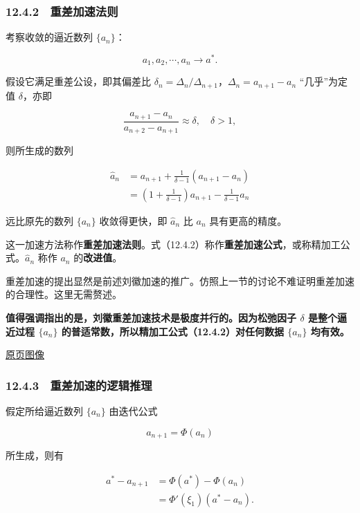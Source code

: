 \documentclass[
  10pt,
  fontset=fandol]{ctexart}
\begin{document}
\subsubsection{12.4.2　重差加速法则}\label{ux91cdux5deeux52a0ux901fux6cd5ux5219}

考察收敛的逼近数列 \(\{a_n\}\)：

\[
a_1,a_2,\cdots,a_n\to a^*.
\]

假设它满足重差公设，即其偏差比 \(\delta_n=\Delta_n/\Delta_{n+1}\)，\(\Delta_n=a_{n+1}-a_n\) ``几乎''为定值 \(\delta\)，亦即

\[
\frac{a_{n+1}-a_n}{a_{n+2}-a_{n+1}}\approx\delta,\quad\delta>1,
\tag{12.4.1}
\]

则所生成的数列

\[
\begin{aligned}
\widehat a_n&=a_{n+1}+\frac{1}{\delta-1}(a_{n+1}-a_n)\\
&=\left(1+\frac{1}{\delta-1}\right)a_{n+1}-\frac{1}{\delta-1}a_n
\end{aligned}
\tag{12.4.2}
\]

远比原先的数列 \(\{a_n\}\) 收敛得更快，即 \(\widehat a_n\) 比 \(a_n\) 具有更高的精度。

这一加速方法称作\textbf{重差加速法则}。式（12.4.2）称作\textbf{重差加速公式}，或称精加工公式。\(\widehat a_n\) 称作 \(a_n\) 的\textbf{改进值}。

重差加速的提出显然是前述刘徽加速的推广。仿照上一节的讨论不难证明重差加速的合理性。这里无需赘述。

\textbf{值得强调指出的是，刘徽重差加速技术是极度并行的。因为松弛因子 \(\delta\) 是整个逼近过程 \(\{a_n\}\) 的普适常数，所以精加工公式（12.4.2）对任何数据 \(\{a_n\}\) 均有效。}

\href{../../source-images/pdf-306.jpeg}{原页图像}

\subsubsection{12.4.3　重差加速的逻辑推理}\label{ux91cdux5deeux52a0ux901fux7684ux903bux8f91ux63a8ux7406}

假定所给逼近数列 \(\{a_n\}\) 由迭代公式

\[
a_{n+1}=\Phi(a_n)
\]

所生成，则有

\[
\begin{aligned}
a^*-a_{n+1}&=\Phi(a^*)-\Phi(a_n)\\
&=\Phi'(\xi_1)(a^*-a_n).
\end{aligned}
\]
\end{document}
